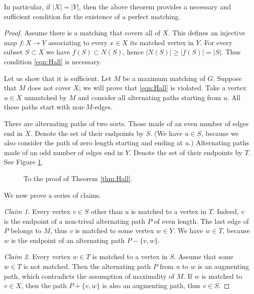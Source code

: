 

\setcounter{section}{4}
\setcounter{subsection}{4}
\setcounter{dfn}{7}

In particular, if $|X| = |Y|$, then the above theorem provides a necessary and sufficient condition for the existence of a perfect matching.
\begin{proof}
Assume there is a matching that covers all of $X$.
This defines an injective map $f \colon X \to Y$ associating to every $x \in X$ its matched vertex in $Y$.
For every subset $S \subset X$ we have $f(S) \subset N(S)$, hence $|N(S)| \ge |f(S)| = |S|$.
Thus condition \eqref{eqn:Hall} is necessary.

Let us show that it is sufficient.
Let $M$ be a maximum matching of $G$.
Suppose that $M$ does not cover $X$; we will prove that \eqref{eqn:Hall} is violated.
Take a vertex $u \in X$ unmatched by $M$ and consider all alternating paths starting from $u$.
All these paths start with non-$M$-edges.

There are alternating paths of two sorts.
Those made of an even number of edges end in $X$.
Denote the set of their endpoints by $S$.
(We have $u \in S$, because we also consider the path of zero length starting and ending at $u$.)
Alternating paths made of an odd number of edges end in $Y$.
Denote the set of their endpoints by $T$.
See Figure \ref{fig:HallProof}.

\begin{figure}[ht]
\begin{center}

\end{center}
\caption{To the proof of Theorem \ref{thm:Hall}.}
\label{fig:HallProof}
\end{figure}

We now prove a series of claims.

\emph{Claim 1.} Every vertex $v \in S$ other than $u$ is matched to a vertex in $T$.
Indeed, $v$ is the endpoint of a non-trival alternating path $P$ of even length.
The last edge of $P$ belongs to $M$, thus $v$ is matched to some vertex $w \in Y$.
We have $w \in T$, because $w$ is the endpoint of an alternating path $P - \{v,w\}$.

\emph{Claim 2.} Every vertex $w \in T$ is matched to a vertex in $S$.
Assume that some $w \in T$ is not matched.
Then the alternating path $P$ from $u$ to $w$ is an augmenting path, which contradicts the assumption of maximality of $M$.
If $w$ is matched to $v \in X$, then the path $P + \{v,w\}$ is also an augmenting path, thus $v \in S$.


\end{proof}
